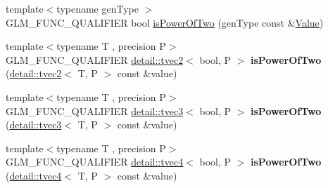 \begin{DoxyCompactItemize}
\item 
{\footnotesize template$<$typename gen\+Type $>$ }\\G\+L\+M\+\_\+\+F\+U\+N\+C\+\_\+\+Q\+U\+A\+L\+I\+F\+I\+ER bool \hyperlink{group__gtx__bit_ga5ddca7546d8be35992eedd3411842545}{is\+Power\+Of\+Two} (gen\+Type const \&\hyperlink{document_8h_a071cf97155ba72ac9a1fc4ad7e63d481}{Value})
\item 
{\footnotesize template$<$typename T , precision P$>$ }\\G\+L\+M\+\_\+\+F\+U\+N\+C\+\_\+\+Q\+U\+A\+L\+I\+F\+I\+ER \hyperlink{structglm_1_1detail_1_1tvec2}{detail\+::tvec2}$<$ bool, P $>$ {\bfseries is\+Power\+Of\+Two} (\hyperlink{structglm_1_1detail_1_1tvec2}{detail\+::tvec2}$<$ T, P $>$ const \&value)\hypertarget{namespaceglm_a9a3caa0a27cd099623517846f6ae1d23}{}\label{namespaceglm_a9a3caa0a27cd099623517846f6ae1d23}

\item 
{\footnotesize template$<$typename T , precision P$>$ }\\G\+L\+M\+\_\+\+F\+U\+N\+C\+\_\+\+Q\+U\+A\+L\+I\+F\+I\+ER \hyperlink{structglm_1_1detail_1_1tvec3}{detail\+::tvec3}$<$ bool, P $>$ {\bfseries is\+Power\+Of\+Two} (\hyperlink{structglm_1_1detail_1_1tvec3}{detail\+::tvec3}$<$ T, P $>$ const \&value)\hypertarget{namespaceglm_afd117094f8c3507a5fa6598be1f089c1}{}\label{namespaceglm_afd117094f8c3507a5fa6598be1f089c1}

\item 
{\footnotesize template$<$typename T , precision P$>$ }\\G\+L\+M\+\_\+\+F\+U\+N\+C\+\_\+\+Q\+U\+A\+L\+I\+F\+I\+ER \hyperlink{structglm_1_1detail_1_1tvec4}{detail\+::tvec4}$<$ bool, P $>$ {\bfseries is\+Power\+Of\+Two} (\hyperlink{structglm_1_1detail_1_1tvec4}{detail\+::tvec4}$<$ T, P $>$ const \&value)\hypertarget{namespaceglm_a071c03cdef9f44cac492f572b218c42c}{}\label{namespaceglm_a071c03cdef9f44cac492f572b218c42c}


\end{DoxyCompactItemize}
